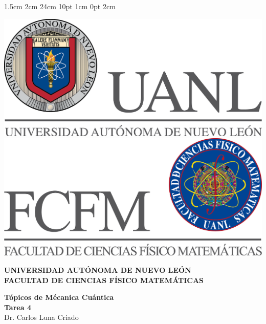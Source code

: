 \documentclass[12pt,letterpaper]{report}
\begin{document}
\setmargins{2.5cm}      
{1.5cm}                     
{2cm}  
{24cm}                    
{10pt}                          
{1cm}                          
{0pt}                             
{2cm}
\begin{titlepage}
\begin{center}
\includegraphics[scale=0.40]{../../Logos/uanl.png} 
\hspace{2.5cm}
\includegraphics[scale=0.40]{../../Logos/fcfm.png}
\end{center}
\vspace{2cm}
\begin{center}
\textbf{
UNIVERSIDAD AUTÓNOMA DE NUEVO LEÓN\\
FACULTAD DE CIENCIAS
    FÍSICO MATEMÁTICAS}\\
\vspace*{2cm}
\begin{large}
\vspace{1cm}
\large{\textbf{Tópicos de Mécanica Cuántica}}\\
\textbf{Tarea 4}\\
Dr. Carlos Luna Criado\\
\end{large}
\vspace{3.5cm}
\begin{minipage}{0.6\linewidth}
\vspace{0.5cm}

\end{minipage}
\end{center}
\end{titlepage}
\end{document}

